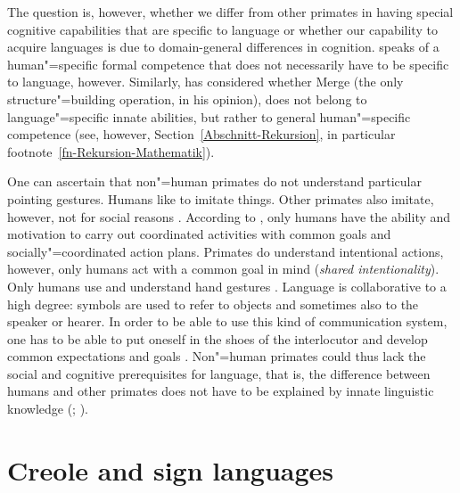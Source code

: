 The question is, however, whether we differ from other primates in having special cognitive
capabilities that are specific to language or whether our capability to acquire languages is due to
domain-general differences in cognition. \citet[Section~2]{Fanselow92b} speaks of a human"=specific formal competence that does not necessarily
have to be specific to language, however. Similarly, \citet[--8]{Chomsky2007a} has considered whether Merge (the only structure"=building
operation, in his opinion), does not belong to language"=specific innate abilities, but rather to general human"=specific competence (see, however,
Section~\ref{Abschnitt-Rekursion}, in particular footnote~\ref{fn-Rekursion-Mathematik}).  

One can ascertain that non"=human primates do not understand particular pointing gestures. Humans like to imitate things. Other primates also imitate, however, not
for social reasons \citep[--10]{Tomasello2006c}. According to \citet[]{TCCBM2005a}, only humans have the ability and motivation to
carry out coordinated activities with common goals and socially"=coordinated action plans. Primates do understand intentional actions, however, only humans
act with a common goal in mind (\emph{shared intentionality}).
Only humans use and understand hand gestures \citep[, 724, 726]{TCCBM2005a}. Language is collaborative to a high degree: symbols
are used to refer to objects and sometimes also to the speaker or hearer. In order to be able to use this kind of communication system, one has to be able to
put oneself in the shoes of the interlocutor and develop common expectations and goals \citep[]{TCCBM2005a}.
Non"=human primates could thus lack the social and cognitive prerequisites for language, that is, the difference between humans and other primates does not have
to be explained by innate linguistic knowledge (\citealp[Section~8.1.2]{Tomasello2003a};
\citealp{TCCBM2005a}).

\section{Creole and sign languages}

